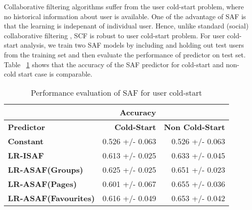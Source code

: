 Collaborative filtering algorithms suffer from the user cold-start problem,
where no historical information about user is available. One of the advantage of SAF is that 
the learning is indepenant of individual user. Hence, unlike standard (social) collaborative
filtering , SCF is robust to user cold-start problem.  For user cold-start analysis, we train
two SAF models by including and holding out test users from the training set and then evaluate
the performance of predictor on test set. Table ~\ref{tab:coldstart} shows that the accuracy 
of the SAF predictor for cold-start and non-cold start case is comparable.  

\begin{table}[t!]
\centering
\begin{tabular}{|>{\small}l|>{\small}r|>{\small}r|}
\hline
& \textbf{Accuracy}&\\
\hline
\textbf{Predictor}& \textbf{Cold-Start} & \textbf{Non Cold-Start}\\
\hline
\textbf{Constant} & 0.526  +/-  0.063 & 0.526  +/-  0.063 \\
\hline
\textbf{LR-ISAF} & 0.613 +/- 0.025 & 0.633  +/-  0.045 \\
\hline
\textbf{LR-ASAF(Groups)} & 0.625  +/-  0.025 & 0.651  +/-  0.023 \\
\hline
\textbf{LR-ASAF(Pages)} & 0.601  +/-  0.067 & 0.655  +/-  0.036 \\
\hline
\textbf{LR-ASAF(Favourites)} & 0.616  +/-  0.049 & 0.653  +/-  0.042\\
\hline
\end{tabular}
\caption{Performance evaluation of SAF for user cold-start}
\label{tab:coldstart}
\end{table}